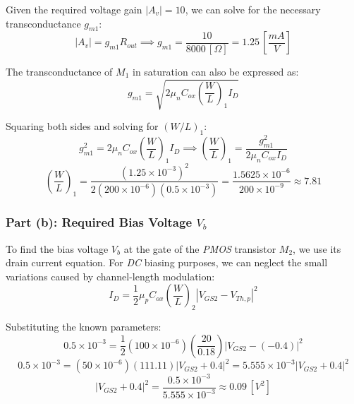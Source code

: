\documentclass[12pt,a4paper]{article}
\begin{document}
Given the required voltage gain $|A_{v}| = 10$, we can solve for the necessary transconductance $g_{m1}$:
\begin{equation}
    |A_{v}| = g_{m1} R_{out} \implies g_{m1} = \frac{10}{8000 \, [\Omega]} = 1.25 \, \left[\frac{mA}{V}\right]
    \label{eq_44}
\end{equation}

The transconductance of $M_{1}$ in saturation can also be expressed as:
\begin{equation}
    g_{m1} = \sqrt{2 \mu_{n} C_{ox} \left(\frac{W}{L}\right)_{1} I_{D}}
    \label{eq_45}
\end{equation}

Squaring both sides and solving for $(W/L)_{1}$:
\begin{equation}
    g_{m1}^{2} = 2 \mu_{n} C_{ox} \left(\frac{W}{L}\right)_{1} I_{D} \implies \left(\frac{W}{L}\right)_{1} = \frac{g_{m1}^{2}}{2 \mu_{n} C_{ox} I_{D}}
    \label{eq_46}
\end{equation}
\begin{equation}
    \left(\frac{W}{L}\right)_{1} = \frac{(1.25 \times 10^{-3})^{2}}{2 (200 \times 10^{-6}) (0.5 \times 10^{-3})} = \frac{1.5625 \times 10^{-6}}{200 \times 10^{-9}} \approx 7.81
    \label{eq_47}
\end{equation}


\subsubsection{Part (b): Required Bias Voltage $V_{b}$}             \label{sec_6.2.2}
To find the bias voltage $V_{b}$ at the gate of the \textit{PMOS} transistor $M_{2}$, we use its drain current equation. For \textit{DC} biasing purposes, we can neglect the small variations caused by channel-length modulation:
\begin{equation}
    I_{D} = \frac{1}{2} \mu_{p} C_{ox} \left(\frac{W}{L}\right)_{2} |V_{GS2} - V_{Th,p}|^{2}
    \label{eq_48}
\end{equation}

Substituting the known parameters:
\begin{equation}
    0.5 \times 10^{-3} = \frac{1}{2} (100 \times 10^{-6}) \left(\frac{20}{0.18}\right) |V_{GS2} - (-0.4)|^{2}
    \label{eq_49}
\end{equation}
\begin{equation}
    0.5 \times 10^{-3} = (50 \times 10^{-6}) (111.11) |V_{GS2} + 0.4|^{2} = 5.555 \times 10^{-3} |V_{GS2} + 0.4|^{2}
    \label{eq_50}
\end{equation}
\begin{equation}
    |V_{GS2} + 0.4|^{2} = \frac{0.5 \times 10^{-3}}{5.555 \times 10^{-3}} \approx 0.09 \, [V^{2}]
    \label{eq_51}
\end{equation}
\end{document}
